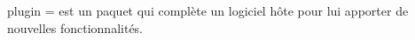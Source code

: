 

plugin = est un paquet qui complète un logiciel hôte pour lui apporter de nouvelles fonctionnalités.
